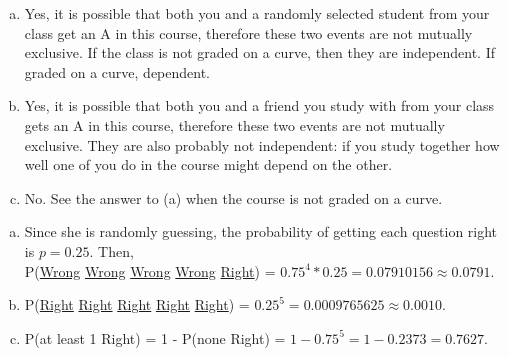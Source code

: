 {
{
\begin{enumerate}[(a)]
\setlength{\itemsep}{0mm}
\item Yes, it is possible that both you and a randomly selected student from your class get an A in this course, therefore these two events are not mutually exclusive. If the class is not graded on a curve, then they are independent. If graded on a curve, dependent.
\item Yes, it is possible that both you and a friend you study with from your class gets an A in this course, therefore these two events are not mutually exclusive. They are also probably not independent: if you study together how well one of you do in the course might depend on the other.
\item No. See the answer to (a) when the course is not graded on a curve.
\end{enumerate}
}
}


{
\begin{enumerate}[(a)]
\setlength{\itemsep}{0mm}
\item Since she is randomly guessing, the probability of getting each question right is $p = 0.25$. Then, \\
P(\underline{Wrong} \underline{Wrong} \underline{Wrong} \underline{Wrong} \underline{Right}) = $0.75^4 * 0.25 = 0.07910156 \approx 0.0791$.
\item P(\underline{Right} \underline{Right} \underline{Right} \underline{Right} \underline{Right}) = $0.25^5 = 0.0009765625 \approx 0.0010$.
\item P(at least 1 Right) = 1 - P(none Right) = $1 - 0.75^5 = 1 - 0.2373 = 0.7627$.
\end{enumerate}
}

